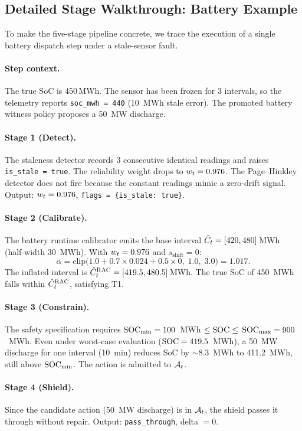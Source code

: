 \subsection{Detailed Stage Walkthrough: Battery Example}

To make the five-stage pipeline concrete, we trace the execution of a single
battery dispatch step under a stale-sensor fault.

\paragraph{Step context.}  The true SoC is 450\,MWh.  The sensor has been frozen for
3 intervals, so the telemetry reports \texttt{soc\_mwh = 440} (10~MWh stale error).
The promoted battery witness policy proposes a 50~MW discharge.

\paragraph{Stage 1 (Detect).}
The staleness detector records 3 consecutive identical readings and raises
\texttt{is\_stale = true}.  The reliability weight drops to $w_t = 0.976$.  The
Page--Hinkley detector does not fire because the constant readings mimic a
zero-drift signal.  Output: $w_t = 0.976$, \texttt{flags = \{is\_stale: true\}}.

\paragraph{Stage 2 (Calibrate).}
The battery runtime calibrator emits the base interval $\hat{C}_t = [420, 480]$\,MWh
(half-width 30~MWh).  With $w_t = 0.976$ and $s_{\mathrm{shift}} = 0$:
\[
  \alpha = \mathrm{clip}\!\bigl(1.0 + 0.7 \times 0.024 + 0.5 \times 0,\; 1.0,\; 3.0\bigr
  ) = 1.017.
\]
The inflated interval is $\hat{C}_t^{\mathrm{RAC}} = [419.5, 480.5]$\,MWh.  The true SoC of 450~MWh
falls within $\hat{C}_t^{\mathrm{RAC}}$, satisfying T1.

\paragraph{Stage 3 (Constrain).}
The safety specification requires $\mathrm{SOC}_{\min} = 100$~MWh $\le \mathrm{SOC} \le$
$\mathrm{SOC}_{\max} = 900$~MWh.  Even under worst-case evaluation ($\mathrm{SOC} = 419.5$~MWh),
a 50~MW discharge for one interval (10~min) reduces SoC by $\sim$8.3~MWh to
411.2~MWh, still above $\mathrm{SOC}_{\min}$.  The action is admitted to $\mathcal{A}_t$.

\paragraph{Stage 4 (Shield).}
Since the candidate action (50~MW discharge) is in $\mathcal{A}_t$, the shield passes it
through without repair.  Output: \texttt{pass\_through}, delta $= 0$.

